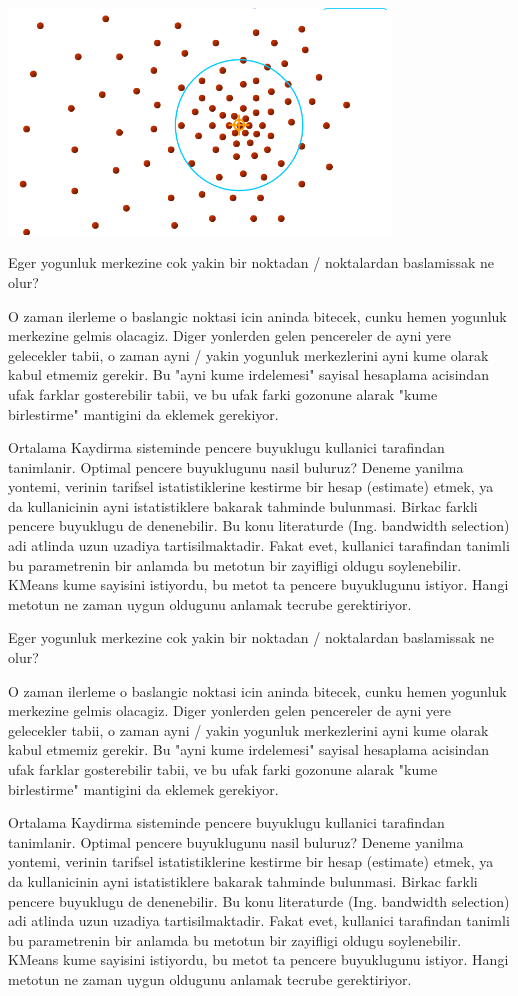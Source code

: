 \documentclass[12pt,fleqn]{article}\usepackage{../common}
\begin{document}
\includegraphics[height=6cm]{mean_7.png}

Eger yogunluk merkezine cok yakin bir noktadan / noktalardan
baslamissak ne olur?

O zaman ilerleme o baslangic noktasi icin aninda bitecek, cunku hemen
yogunluk merkezine gelmis olacagiz. Diger yonlerden gelen pencereler
de ayni yere gelecekler tabii, o zaman ayni / yakin yogunluk
merkezlerini ayni kume olarak kabul etmemiz gerekir. Bu "ayni kume
irdelemesi" sayisal hesaplama acisindan ufak farklar gosterebilir
tabii, ve bu ufak farki gozonune alarak "kume birlestirme" mantigini da
eklemek gerekiyor.

Ortalama Kaydirma sisteminde pencere buyuklugu kullanici tarafindan
tanimlanir.  Optimal pencere buyuklugunu nasil buluruz? Deneme yanilma
yontemi, verinin tarifsel istatistiklerine kestirme bir hesap
(estimate) etmek, ya da kullanicinin ayni istatistiklere bakarak
tahminde bulunmasi. Birkac farkli pencere buyuklugu de denenebilir. Bu
konu literaturde (Ing. bandwidth selection) adi atlinda uzun uzadiya
tartisilmaktadir. Fakat evet, kullanici tarafindan tanimli bu
parametrenin bir anlamda bu metotun bir zayifligi oldugu soylenebilir. KMeans
kume sayisini istiyordu, bu metot ta pencere buyuklugunu istiyor. Hangi
metotun ne zaman uygun oldugunu anlamak tecrube gerektiriyor. 

Eger yogunluk merkezine cok yakin bir noktadan / noktalardan
baslamissak ne olur?

O zaman ilerleme o baslangic noktasi icin aninda bitecek, cunku hemen
yogunluk merkezine gelmis olacagiz. Diger yonlerden gelen pencereler
de ayni yere gelecekler tabii, o zaman ayni / yakin yogunluk
merkezlerini ayni kume olarak kabul etmemiz gerekir. Bu "ayni kume
irdelemesi" sayisal hesaplama acisindan ufak farklar gosterebilir
tabii, ve bu ufak farki gozonune alarak "kume birlestirme" mantigini da
eklemek gerekiyor.

Ortalama Kaydirma sisteminde pencere buyuklugu kullanici tarafindan
tanimlanir.  Optimal pencere buyuklugunu nasil buluruz? Deneme yanilma
yontemi, verinin tarifsel istatistiklerine kestirme bir hesap
(estimate) etmek, ya da kullanicinin ayni istatistiklere bakarak
tahminde bulunmasi. Birkac farkli pencere buyuklugu de denenebilir. Bu
konu literaturde (Ing. bandwidth selection) adi atlinda uzun uzadiya
tartisilmaktadir. Fakat evet, kullanici tarafindan tanimli bu
parametrenin bir anlamda bu metotun bir zayifligi oldugu soylenebilir. KMeans
kume sayisini istiyordu, bu metot ta pencere buyuklugunu istiyor. Hangi
metotun ne zaman uygun oldugunu anlamak tecrube gerektiriyor. 
\end{document}
